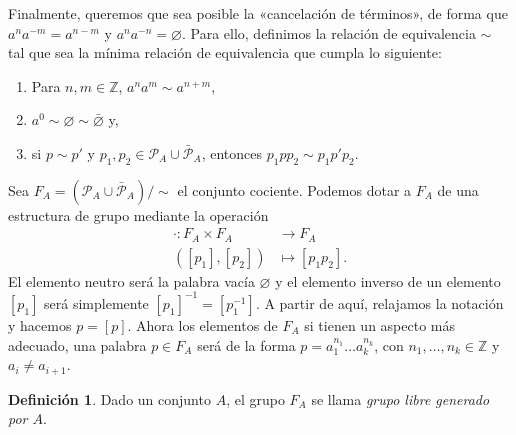 \documentclass[12pt,a4paper]{book}
\theoremstyle{definition} \newtheorem{defn}[thm]{Definición}
\theoremstyle{definition} \newtheorem{ejemplo}[thm]{Ejemplo}
\theoremstyle{definition} \newtheorem{ejercicio}[thm]{Ejercicio}
\theoremstyle{remark} \newtheorem*{obs}{Observación}
\def\ZZ{\mathbb{Z}}
\begin{document}
      Finalmente, queremos que sea posible la «cancelación de términos», de forma que $a^na^{-m}=a^{n-m}$ y $a^na^{-n}=\varnothing$. Para ello, definimos la relación de equivalencia $\sim$ tal que sea la mínima relación de equivalencia que cumpla lo siguiente:
      \begin{enumerate}
	\item Para $n,m\in \ZZ$, $a^na^m\sim a^{n+m}$,
	\item $a^0\sim \varnothing \sim \bar{\varnothing}$ y,
	\item si $p\sim p'$ y $p_1,p_2\in \mathcal{P}_A\cup\bar{\mathcal{P}}_A$, entonces $p_1pp_2\sim p_1p'p_2$.
      \end{enumerate}
      Sea $F_A=(\mathcal{P}_A\cup\bar{\mathcal{P}}_A)/\sim$ el conjunto cociente. Podemos dotar a $F_A$ de una estructura de grupo mediante la operación
      \begin{align*}
	 \cdot:F_A\times F_A&\longrightarrow F_A\\ 
	 ([p_1],[p_2]) &\longmapsto [p_1p_2]. 
	\end{align*}
	El elemento neutro será la palabra vacía $\varnothing$ y el elemento inverso de un elemento $[p_1]$ será simplemente $[p_1]^{-1}=[p_1^{-1}]$. A partir de aquí, relajamos la notación y hacemos $p=[p]$. Ahora los elementos de $F_A$ si tienen un aspecto más adecuado, una palabra $p\in F_A$ será de la forma $p=a_{1}^{n_1}\dots a_k^{n_k}$, con $n_1,\dots,n_k\in \ZZ$ y $a_i\neq a_{i+1}$.

	\begin{defn}
	  Dado un conjunto $A$, el grupo $F_A$ se llama \emph{grupo libre generado por $A$}.
	\end{defn}
\end{document}

